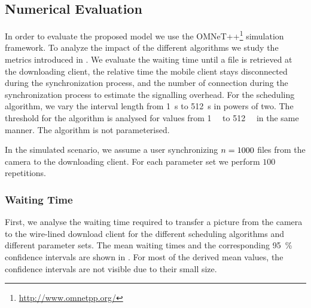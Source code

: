 \subsection{Numerical Evaluation}\label{sec:application:cloud_file_synchronisation:numerical_evaluation}
In order to evaluate the proposed model we use the OMNeT++\footnote{\url{http://www.omnetpp.org/}} simulation framework.
To analyze the impact of the different algorithms we study the metrics introduced in .
We evaluate the waiting time \sojournTime until a file is retrieved at the downloading client, the relative time the mobile client stays disconnected \relativeDisconnectedTime during the synchronization process, and the number of connection \connectionCount during the synchronization process to estimate the signalling overhead.
For the \algointerval scheduling algorithm, we vary the interval length from \SI{1}{\second} to \SI{512}{\second} in powers of two.
The threshold for the \algosize algorithm is analysed for values from \SI{1}{\mega\byte} to \SI{512}{\mega\byte} in the same manner.
The \algoimmediate algorithm is not parameterised.

In the simulated scenario, we assume a user synchronizing \(n = 1000\) files from the camera to the downloading client.
For each parameter set we perform \(100\) repetitions.

\subsubsection*{Waiting Time}\label{sec:application:cloud_file_synchronisation:numerical_evaluation:waiting_time}
First, we analyse the waiting time \sojournTime required to transfer a picture from the camera to the wire-lined download client for the different scheduling algorithms and different parameter sets.
The mean waiting times and the corresponding \SI{95}{\percent} confidence intervals are shown in .
For most of the derived mean values, the confidence intervals are not visible due to their small size.

